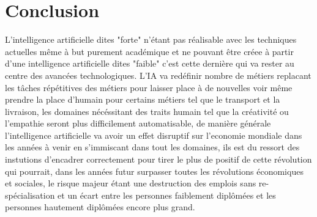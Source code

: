 \chapter*{Conclusion}
L'intelligence artificielle dites "forte" n'étant pas réalisable avec 
les techniques actuelles même à but purement académique 
et ne pouvant être créee à partir d'une intelligence artificielle dites "faible"
c'est cette dernière qui va rester au centre des avancées technologiques.
L'IA va redéfinir nombre de métiers replacant les tâches répétitives des métiers 
pour laisser place à de nouvelles voir même prendre la place d'humain pour certains 
métiers tel que le transport et la livraison, les domaines nécéssitant 
des traits humain tel que la créativité ou l'empathie seront plus difficilement 
automatisable, de manière générale l'intelligence artificielle va avoir 
un effet disruptif sur l'economie mondiale dans les années à venir 
en s'immiscant dans tout les domaines, ils est du ressort des instutions
d'encadrer correctement pour tirer le plus de positif de cette révolution
qui pourrait, dans les années futur surpasser toutes les révolutions économiques
et sociales, le risque majeur étant une destruction des emplois sans re-spécialisation
et un écart entre les personnes faiblement diplômées et les personnes 
hautement diplômées encore plus grand.
